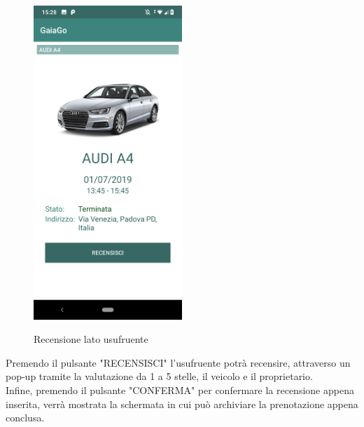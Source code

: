 \begin{itemize}
\begin{figure}[H]
		\includegraphics[width=0.5\textwidth]{res/images/recensisci.png}\\
		\caption{Recensione lato usufruente}
		\label{recensisci}
	\end{figure}
	Premendo il pulsante "RECENSISCI" l'usufruente potrà recensire, attraverso un pop-up tramite la valutazione da 1 a 5 stelle, il veicolo e il proprietario.\\
	Infine, premendo il pulsante "CONFERMA" per confermare la recensione appena inserita, verrà mostrata la schermata in cui può archiviare la prenotazione appena conclusa. 


\end{itemize}
